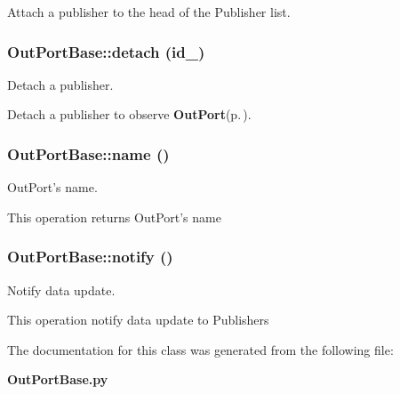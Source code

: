Attach a publisher to the head of the Publisher list.
\subsubsection{\setlength{\rightskip}{0pt plus 5cm}Out\-Port\-Base::detach (id\_\-)}\label{classOutPortBase_OutPortBasea12}


Detach a publisher. 

Detach a publisher to observe {\bf Out\-Port}{\rm (p.\,\pageref{classOutPort})}.
\subsubsection{\setlength{\rightskip}{0pt plus 5cm}Out\-Port\-Base::name ()}\label{classOutPortBase_OutPortBasea8}


Out\-Port's name. 

This operation returns Out\-Port's name
\subsubsection{\setlength{\rightskip}{0pt plus 5cm}Out\-Port\-Base::notify ()}\label{classOutPortBase_OutPortBasea13}


Notify data update. 

This operation notify data update to Publishers

The documentation for this class was generated from the following file:\begin{CompactItemize}
\item 
{\bf Out\-Port\-Base.py}\end{CompactItemize}
